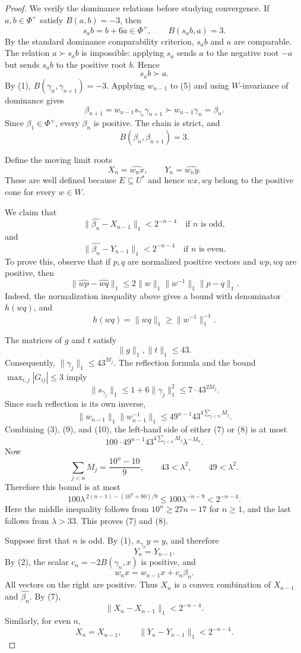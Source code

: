 \documentclass[11pt,reqno]{amsart}
\theoremstyle{plain}
\theoremstyle{definition}
\theoremstyle{remark}
\numberwithin{equation}{section}
\begin{document}
\begin{proof}
We verify the dominance relations before studying convergence.
If $a,b\in\Phi^+$ satisfy $B(a,b)=-3$, then
\[
s_ab=b+6a\in\Phi^+,
\qquad B(s_ab,a)=3.
\]
By the standard dominance comparability criterion, $s_ab$ and $a$
are comparable. The relation $a\succ s_ab$ is impossible:
applying $s_a$ sends $a$ to the negative root $-a$ but sends
$s_ab$ to the positive root $b$. Hence
\[
s_ab\succ a.
\tag{5}
\]
By (1), $B(\gamma_n,\gamma_{n+1})=-3$. Applying $w_{n-1}$ to (5)
and using $W$-invariance of dominance gives
\[
\beta_{n+1}
=w_{n-1}s_{\gamma_n}\gamma_{n+1}
\succ w_{n-1}\gamma_n
=\beta_n.
\]
Since $\beta_1\in\Phi^+$, every $\beta_n$ is positive. The chain is
strict, and
\[
B(\beta_n,\beta_{n+1})=3.
\tag{6}
\]

Define the moving limit roots
\[
X_n=\widehat{w_nx},\qquad
Y_n=\widehat{w_ny}.
\]
These are well defined because $E\subseteq U^*$ and hence
$wx,wy$ belong to the positive cone for every $w\in W$.

We claim that
\[
\|\widehat{\beta_n}-X_{n-1}\|_1<2^{-n-4}
\quad\text{if }n\text{ is odd},
\tag{7}
\]
and
\[
\|\widehat{\beta_n}-Y_{n-1}\|_1<2^{-n-4}
\quad\text{if }n\text{ is even}.
\tag{8}
\]
To prove this, observe that if $p,q$ are normalized positive vectors
and $wp,wq$ are positive, then
\[
\|\widehat{wp}-\widehat{wq}\|_1
\leq
2\|w\|_1\|w^{-1}\|_1\|p-q\|_1.
\tag{9}
\]
Indeed, the normalization inequality above gives a bound with
denominator $h(wq)$, and
\[
h(wq)=\|wq\|_1\geq\|w^{-1}\|_1^{-1}.
\]

The matrices of $g$ and $t$ satisfy
\[
\|g\|_1,\|t\|_1\leq43.
\]
Consequently, $\|\gamma_j\|_1\leq43^{M_j}$. The reflection formula
and the bound $\max_{i,j}|G_{ij}|\leq3$ imply
\[
\|s_{\gamma_j}\|_1
\leq1+6\|\gamma_j\|_1^2
\leq7\cdot43^{2M_j}.
\]
Since each reflection is its own inverse,
\[
\|w_{n-1}\|_1\|w_{n-1}^{-1}\|_1
\leq49^{n-1}43^{4\sum_{j<n}M_j}.
\tag{10}
\]
Combining (3), (9), and (10), the left-hand side of either
(7) or (8) is at most
\[
100\cdot49^{n-1}
43^{4\sum_{j<n}M_j}\lambda^{-M_n}.
\]
Now
\[
\sum_{j<n}M_j=\frac{10^n-10}{9},
\qquad
43<\lambda^2,\qquad49<\lambda^2.
\]
Therefore this bound is at most
\[
100\lambda^{\,2(n-1)-(10^n+80)/9}
\leq100\lambda^{-n-9}
<2^{-n-4}.
\]
Here the middle inequality follows from
$10^n\geq27n-17$ for $n\geq1$, and the last follows from
$\lambda>33$. This proves (7) and (8).

Suppose first that $n$ is odd. By (1),
$s_{\gamma_n}y=y$, and therefore
\[
Y_n=Y_{n-1}.
\]
By (2), the scalar $c_n=-2B(\gamma_n,x)$ is positive, and
\[
w_nx=w_{n-1}x+c_n\beta_n.
\]
All vectors on the right are positive. Thus $X_n$ is a convex
combination of $X_{n-1}$ and $\widehat{\beta_n}$. By (7),
\[
\|X_n-X_{n-1}\|_1<2^{-n-4}.
\tag{11}
\]
Similarly, for even $n$,
\[
X_n=X_{n-1},
\qquad
\|Y_n-Y_{n-1}\|_1<2^{-n-4}.
\tag{12}
\]


\end{proof}
\end{document}
